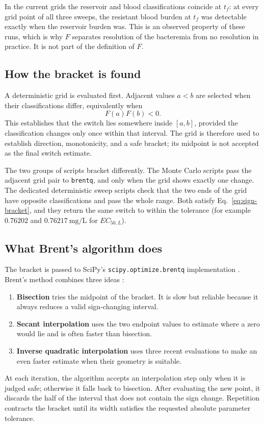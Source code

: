 \documentclass[11pt]{article}
\newcommand{\EC}{EC_{50,L}}
\begin{document}
In the current grids the reservoir and blood classifications coincide at
$t_f$: at every grid point of all three sweeps, the resistant blood burden at
$t_f$ was detectable exactly when the reservoir burden was. This is an
observed property of these runs, which is why $F$ separates resolution of the
bacteremia from no resolution in practice. It is not part of the definition
of $F$.

\subsection{How the bracket is found}

A deterministic grid is evaluated first. Adjacent values $a<b$ are selected
when their classifications differ, equivalently when
\begin{equation}
F(a)F(b)<0.
\label{eq:sign-bracket}
\end{equation}
This establishes that the switch lies somewhere inside $[a,b]$, provided the
classification changes only once within that interval. The grid is therefore
used to establish direction, monotonicity, and a safe bracket; its midpoint
is not accepted as the final switch estimate.

The two groups of scripts bracket differently. The Monte Carlo scripts pass
the adjacent grid pair to \texttt{brentq}, and only when the grid shows
exactly one change. The dedicated deterministic sweep scripts check that the
two ends of the grid have opposite classifications and pass the whole range.
Both satisfy Eq.~\eqref{eq:sign-bracket}, and they return the same switch to
within the tolerance (for example $0.76202$ and $0.76217~\mathrm{mg/L}$ for
$\EC$).

\subsection{What Brent's algorithm does}

The bracket is passed to SciPy's
\texttt{scipy.optimize.brentq} implementation \cite{scipyBrentq}. Brent's
method combines three ideas \cite{brent1973}:
\begin{enumerate}
\item \textbf{Bisection} tries the midpoint of the bracket. It is slow but
reliable because it always reduces a valid sign-changing interval.
\item \textbf{Secant interpolation} uses the two endpoint values to estimate
where a zero would lie and is often faster than bisection.
\item \textbf{Inverse quadratic interpolation} uses three recent evaluations
to make an even faster estimate when their geometry is suitable.
\end{enumerate}
At each iteration, the algorithm accepts an interpolation step only when it
is judged safe; otherwise it falls back to bisection. After evaluating the
new point, it discards the half of the interval that does not contain the sign
change. Repetition contracts the bracket until its width satisfies the
requested absolute parameter tolerance.
\end{document}
